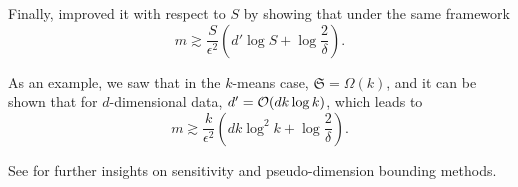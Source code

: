 Finally, \cite{braverman2016coresetsota} improved it with respect to $S$ by showing that under the same framework
\begin{equation*}
	m \gtrsim \frac{S}{\epsilon^{2}} (d' \log S + \log \frac{2}{\delta}).
\end{equation*}


As an example, we saw that in the $k$-means case, $\mathfrak{S} = \Omega(k)$, and it can be shown that for $d$-dimensional data, ${d'} = \mathcal{O}(dk\log k)$, which leads to
\begin{equation*}
    m \gtrsim \frac{k}{\epsilon^{2}} (dk \log^2 k + \log \frac{2}{\delta}).
\end{equation*}

See \cite{bachem2017coresetML} for further insights on sensitivity and pseudo-dimension bounding methods.
